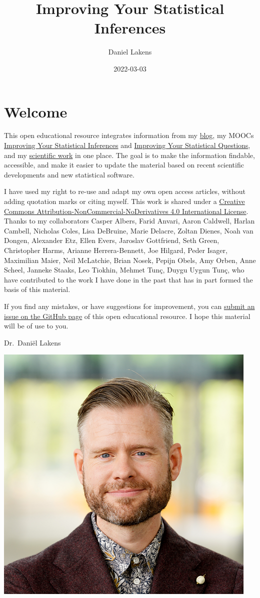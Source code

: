 \documentclass[
]{krantz}
\title{Improving Your Statistical Inferences}
\author{Daniel Lakens}
\date{2022-03-03}
\begin{document}
\maketitle

{
\setcounter{tocdepth}{1}
\tableofcontents
}
\hypertarget{welcome}{%
\chapter*{Welcome}\label{welcome}}

This open educational resource integrates information from my \href{https://daniellakens.blogspot.com/}{blog}, my MOOCs \href{https://www.coursera.org/learn/statistical-inferences}{Improving Your Statistical Inferences} and \href{https://www.coursera.org/learn/improving-statistical-questions}{Improving Your Statistical Questions}, and my \href{https://scholar.google.nl/citations?user=ZbqYyrsAAAAJ\&hl=en}{scientific work} in one place. The goal is to make the information findable, accessible, and make it easier to update the material based on recent scientific developments and new statistical software.

I have used my right to re-use and adapt my own open access articles, without adding quotation marks or citing myself. This work is shared under a \href{https://creativecommons.org/licenses/by-nc-nd/4.0/}{Creative Commons Attribution-NonCommercial-NoDerivatives 4.0 International License}. Thanks to my collaborators Casper Albers, Farid Anvari, Aaron Caldwell, Harlan Cambell, Nicholas Coles, Lisa DeBruine, Marie Delacre, Zoltan Dienes, Noah van Dongen, Alexander Etz, Ellen Evers, Jaroslav Gottfriend, Seth Green, Christopher Harms, Arianne Herrera-Bennett, Joe Hilgard, Peder Isager, Maximilian Maier, Neil McLatchie, Brian Nosek, Pepijn Obels, Amy Orben, Anne Scheel, Janneke Staaks, Leo Tiokhin, Mehmet Tunç, Duygu Uygun Tunç, who have contributed to the work I have done in the past that has in part formed the basis of this material.

If you find any mistakes, or have suggestions for improvement, you can \href{https://github.com/Lakens/statistical_inferences/issues}{submit an issue on the GitHub page} of this open educational resource. I hope this material will be of use to you.

Dr.~Daniël Lakens

\begin{center}\includegraphics[width=0.3\linewidth]{images/me} \end{center}
\end{document}

